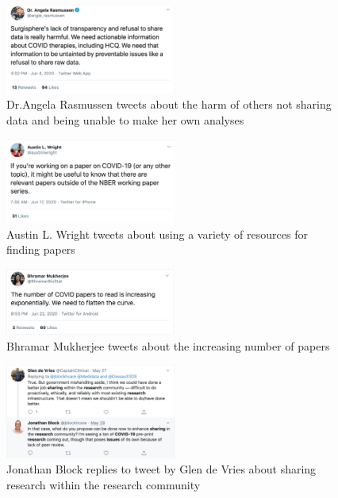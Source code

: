 \documentclass[acmsmall,authordraft]{acmart}
\begin{document}
\begin{figure}
  \includegraphics[width=0.5\textwidth]{Pictures/Appendix_Tweets/angela rasmussen tweet4.png}
  \caption{Dr.Angela Rasmussen tweets about the harm of others not sharing data and being unable to make her own analyses}
  \label{angela_rasmussen_tweet4}
\end{figure}

\begin{figure}
  \includegraphics[width=0.5\textwidth]{Pictures/Appendix_Tweets/austin wright tweet.png}
  \caption{Austin L. Wright tweets about using a variety of resources for finding papers}
  \label{austin_wright_tweet}
\end{figure}

\begin{figure}
  \includegraphics[width=0.5\textwidth]{Pictures/Appendix_Tweets/bhramar mukherjee tweet.png}
  \caption{Bhramar Mukherjee tweets about the increasing number of papers}
  \label{bhramar_mukherjee_tweet}
\end{figure}

\begin{figure}
  \includegraphics[width=0.5\textwidth]{Pictures/Appendix_Tweets/block and vries tweet.png}
  \caption{Jonathan Block replies to tweet by Glen de Vries about sharing research within the research community}
  \label{block_vries_tweet}
\end{figure}
\end{document}
